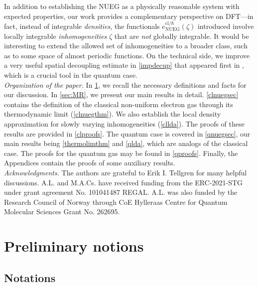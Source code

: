 \documentclass[final,onefignum,onetabnum,reqno]{amsart}
\theoremstyle{remark}
\newcommand{\cl}{\mathrm{cl}} %
\newcommand{\NUEG}{\mathrm{NUEG}} %
\begin{document}
In addition to establishing the NUEG as a physically reasonable system with expected properties, our work provides a complementary perspective on DFT---in fact, instead of integrable \emph{densities}, the functionals $e_\NUEG^{\cl/\hbar}(\zeta)$ introduced involve locally integrable \emph{inhomogeneities} $\zeta$ that are \emph{not} globally integrable. It would be interesting to extend the allowed set of inhomogeneities to a broader class, such as to some space of almost periodic functions.
On the technical side, we improve a very useful spatial decoupling estimate in \cref{impdecup} that appeared first in \cite{lewin2020local}, which is a crucial tool in the quantum case. 
\vspace{.3em}\\
\noindent\emph{Organization of the paper.} In \cref{sec:Prel}, we recall the necessary definitions and facts for our discussion. In \cref{sec:MR}, we present our main results in detail. \cref{clnuegsec} contains the definition of the classical non-uniform electron gas through its thermodynamic limit (\cref{clnuegthm}).
We also establish the local density approximation for slowly varying inhomogeneities (\cref{cllda}). The proofs of these results are provided in \cref{clproofs}.
The quantum case is covered in \cref{qnuegsec}, our main results being \cref{thermolimthm} and \cref{qlda}, which are analogs of the classical case. The proofs for the quantum gas may be found in \cref{qproofs}.
Finally, the Appendices contain the proofs of some auxiliary results. 
\vspace{.3em}\\
\noindent\emph{Acknowledgments.}
The authors are grateful to Erik I. Tellgren for many helpful discussions.
A.L. and M.A.Cs. have received funding from the ERC-2021-STG
under grant agreement No. 101041487 REGAL. A.L. was also funded by the Research
Council of Norway through CoE Hylleraas Centre for Quantum Molecular Sciences
Grant No. 262695. 

\section{Preliminary notions}\label{sec:Prel}

\subsection{Notations}
\end{document}

